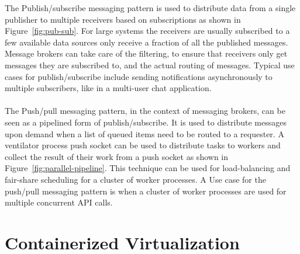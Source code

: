 \newpage
\noindent
The Publish/subscribe messaging pattern is used to distribute data from a single publisher to multiple receivers based on subscriptions as shown in Figure~\ref{fig:pub-sub}. For large systems the receivers are usually subscribed to a few available data sources only receive a fraction of all the published messages. Message brokers can take care of the filtering, to ensure that receivers only get messages they are subscribed to, and the actual routing of messages. Typical use cases for publish/subscribe include sending notifications asynchronously to multiple subscribers, like in a multi-user chat application.
\\ \\
The Push/pull messaging pattern, in the context of messaging brokers, can be seen as a pipelined form of publish/subscribe. It is used to distribute messages upon demand when a list of queued items need to be routed to a requester. A ventilator process push socket can be used to distribute tasks to workers and collect the result of their work from a push socket as shown in Figure~\ref{fig:parallel-pipeline}. This technique can be used for load-balancing and fair-share scheduling for a cluster of worker processes. A Use case for the push/pull messaging pattern is when a cluster of worker processes are used for multiple concurrent API calls.

\section{Containerized Virtualization}

